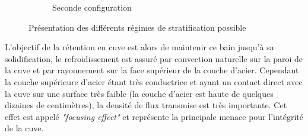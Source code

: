 \begin{figure}[H]
\begin{subfigure}[H]{0.47\textwidth}
	\caption{Seconde configuration}
\end{subfigure}
\caption{Présentation des différents régimes de stratification possible}
\end{figure}
L'objectif de la rétention en cuve est alors de maintenir ce bain jusqu’à sa solidification, le refroidissement est assuré par convection naturelle sur la paroi de la cuve et par rayonnement sur la face supérieur de la couche d'acier. Cependant la couche supérieure d'acier étant très conductrice et ayant un contact direct avec la cuve sur une surface très faible (la couche d'acier est haute de quelques dizaines de centimètres), la densité de flux transmise est très importante. Cet effet est appelé \textit{"focusing effect"} et représente la principale menace pour l'intégrité de la cuve.
